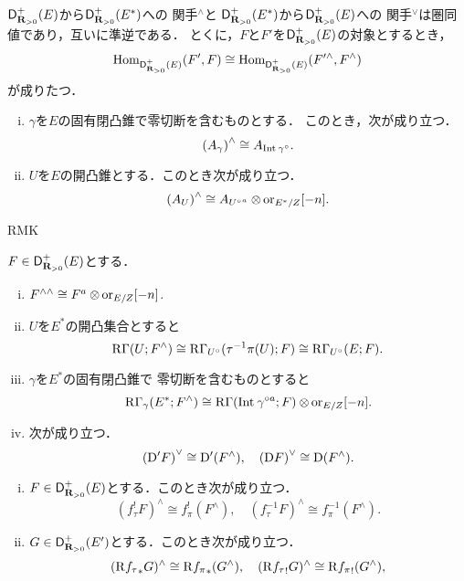 \begin{THM}[{\cite[Theorem 3.7.9]{KS90}}]
    \(\mathop{\mathsf{D}^{+}_{\mathbf{R}_{>0}}}\nolimits(E)\)から\(\mathop{\mathsf{D}^{+}_{\mathbf{R}_{>0}}}\nolimits(E^\ast)\)への
    関手\({}^{\wedge}\)と
    \(\mathop{\mathsf{D}^{+}_{\mathbf{R}_{>0}}}\nolimits(E^\ast)\)から\(\mathop{\mathsf{D}^{+}_{\mathbf{R}_{>0}}}\nolimits(E)\)への
    関手\({}^{\vee}\)は圏同値であり，互いに準逆である．
    とくに，\(F\)と\(F'\)を\(\mathop{\mathsf{D}^{+}_{\mathbf{R}_{>0}}}\nolimits(E)\)の対象とするとき，
    \[
        \mathop{\mathrm{Hom}}\nolimits_{\mathop{\mathsf{D}^{+}_{\mathbf{R}_{>0}}}\nolimits(E)}(F',F)\cong
        \mathop{\mathrm{Hom}}\nolimits_{\mathop{\mathsf{D}^{+}_{\mathbf{R}_{>0}}}\nolimits(E)}(F'^{\wedge},F^{\wedge})
    \]
    が成りたつ．
\end{THM}
\begin{LMM}[{\cite[Lemma 3.7.10]{KS90}}]
    \begin{enumerate}[(i)]
        \item \(\gamma\)を\(E\)の固有閉凸錐で零切断を含むものとする．
        このとき，次が成り立つ．\[
            \left(A_\gamma\right)^\wedge
            \cong A_{\mathop{\mathrm{Int}}\nolimits_{}{\gamma^\circ}}.
        \]
        \item \(U\)を\(E\)の開凸錐とする．このとき次が成り立つ．
        \[
            \left(A_U\right)^\wedge\cong
            A_{{U^{\circ}}^a}\tens \ori_{E^\ast/Z}[-n].
        \]
    \end{enumerate}
\end{LMM}
\begin{RMK}[{\cite[Remark 3.7.11]{KS90}}]
    RMK
\end{RMK}
\begin{PRP}[{\cite[Proposition 3.7.12]{KS90}}]
    \(F\in\mathop{\mathsf{D}^{+}_{\mathbf{R}_{>0}}}\nolimits(E)\)とする．
    \begin{enumerate}[(i)]
        \item \(F^{\wedge\wedge}\cong F^a\tens \ori_{E/Z}[-n]\).
        \item \(U\)を\(E^\ast\)の開凸集合とすると\[
            \mathop{\mathrm{R}\hspace{-0pt}\Gamma}\nolimits(U;F^\wedge)
            \cong\mathop{\mathrm{R}\hspace{-0pt}\Gamma}\nolimits_{U^\circ}(\tau^{-1}\pi(U);F)
            \cong\mathop{\mathrm{R}\hspace{-0pt}\Gamma}\nolimits_{U^\circ}(E;F).
        \]
        \item \(\gamma\)を\(E^\ast\)の固有閉凸錐で
        零切断を含むものとすると\[
            \RG_{\gamma}(E^\ast;F^\wedge)
            \cong
            \RG(\Int{\gamma^{\circ a}};F)\tens\ori_{E/Z}[-n].
        \]
        \item 次が成り立つ．\[
            \left(\mathrm{D}'F\right)^\vee\cong\mathrm{D}'(F^\wedge),
            \quad
            \left(\mathrm{D} F\right)^\vee\cong\mathrm{D}(F^\wedge).
            \]
    \end{enumerate}
\end{PRP}
\begin{PRP}[{\cite[Proposition 3.7.13]{KS90}}]
    \begin{enumerate}[(i)]
        \item \(F\in\mathop{\mathsf{D}^{+}_{\mathbf{R}_{>0}}}\nolimits(E)\)とする．このとき次が成り立つ．\[
            (f_\tau^!F)^\wedge\cong f_\pi^!(F^\wedge),
            \quad
            (f_\tau^{-1}F)^\wedge\cong f_\pi^{-1}(F^\wedge).
            \]
        \item \(G\in\mathop{\mathsf{D}^{+}_{\mathbf{R}_{>0}}}\nolimits(E')\)とする．このとき次が成り立つ．\[
            (\mathrm{R}{f_\tau}_\ast G)^\wedge\cong \mathrm{R}{f_\pi}_\ast(G^\wedge),
            \quad
            (\mathrm{R}{f_\tau}_! G)^\wedge\cong \mathrm{R}{f_\pi}_!(G^\wedge),
            \]
    \end{enumerate}
\end{PRP}
